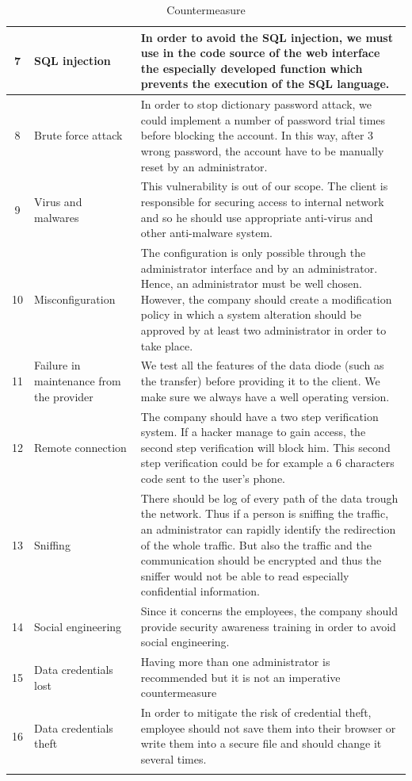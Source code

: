 \documentclass[a4paper,10pt]{article}
\begin{document}
\begin{longtable}{|c|p{2.5cm}|p{12cm}|}
\hline
7 &  SQL injection & In order to avoid the SQL injection, we must use in the code source of the web interface the especially developed function which prevents the execution of the SQL language. \\
\hline
8 & Brute force attack & In order to stop dictionary password attack, we could implement a number of password trial times before blocking the account. In this way, after 3 wrong password, the account have to be manually reset by an administrator. \\
\hline
9 & Virus and malwares & This vulnerability is out of our scope. The client is responsible for securing access to internal network and so he should use appropriate anti-virus and other anti-malware system.  \\
\hline
10 & Misconfiguration & The configuration is only possible through the administrator interface and by an administrator. Hence, an administrator must be well chosen. However, the company should create a modification policy in which a system alteration should be approved by at least two administrator in order to take place.  \\
\hline
11 & Failure in maintenance from the provider & We test all the features of the data diode (such as the transfer) before providing it to the client. We make sure we always have a well operating version. \\
\hline
12 & Remote connection & The company should have a two step verification system. If a hacker manage to gain access, the second step verification will block him. This second step verification could be for example a 6 characters code sent to the user's phone. \\
\hline
13 & Sniffing & There should be log of every path of the data trough the network. Thus if a person is sniffing the traffic, an administrator can rapidly identify the redirection of the whole traffic. But also the traffic and the communication should be encrypted and thus the sniffer would not be able to read especially confidential information. \\
\hline
14 & Social engineering & Since it concerns the employees, the company should provide security awareness training in order to avoid social engineering.  \\
\hline
15 & Data credentials lost & Having more than one administrator is recommended but it is not an imperative countermeasure \\
\hline
16 & Data credentials theft & In order to mitigate the risk of credential theft, employee should not save them into their browser or write them into a secure file and should change it several times. \\
\hline
\caption{Countermeasure}
\label{tab:contermesure}
\end{longtable}
\end{document}
